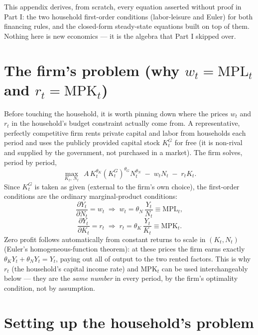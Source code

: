 \documentclass[11pt]{article}
\newcommand{\eq}[1]{\begin{equation}#1\end{equation}}
\begin{document}
This appendix derives, from scratch, every equation asserted without proof
in Part I: the two household first-order conditions (labor-leisure and
Euler) for both financing rules, and the closed-form steady-state
equations built on top of them. Nothing here is new economics --- it is
the algebra that Part I skipped over.

\section{The firm's problem (why $w_t=\mathrm{MPL}_t$ and $r_t=\mathrm{MPK}_t$)}
\label{app:firm}

Before touching the household, it is worth pinning down where the prices
$w_t$ and $r_t$ in the household's budget constraint actually come from.
A representative, perfectly competitive firm rents private capital and
labor from households each period and uses the publicly provided capital
stock $K^G_t$ for free (it is non-rival and supplied by the government, not
purchased in a market). The firm solves, period by period,
\eq{ \max_{K_t,\,N_t}\ \ A\,K_t^{\theta_K}(K^G_t)^{\theta_G}N_t^{\theta_N} \;-\; w_tN_t \;-\; r_tK_t. }
Since $K^G_t$ is taken as given (external to the firm's own choice), the
first-order conditions are the ordinary marginal-product conditions:
\eq{ \frac{\partial Y_t}{\partial N_t} = w_t \;\Longrightarrow\; w_t=\theta_N\,\frac{Y_t}{N_t} \equiv \mathrm{MPL}_t, }
\eq{ \frac{\partial Y_t}{\partial K_t} = r_t \;\Longrightarrow\; r_t=\theta_K\,\frac{Y_t}{K_t} \equiv \mathrm{MPK}_t. }
Zero profit follows automatically from constant returns to scale in
$(K_t,N_t)$ (Euler's homogeneous-function theorem): at these prices the
firm earns exactly $\theta_K Y_t+\theta_N Y_t=Y_t$, paying out all of
output to the two rented factors. This is why $r_t$ (the household's
capital income rate) and $\mathrm{MPK}_t$ can be used interchangeably
below --- they are the \emph{same number} in every period, by the firm's
optimality condition, not by assumption.

\section{Setting up the household's problem}
\label{app:setup}
\end{document}
